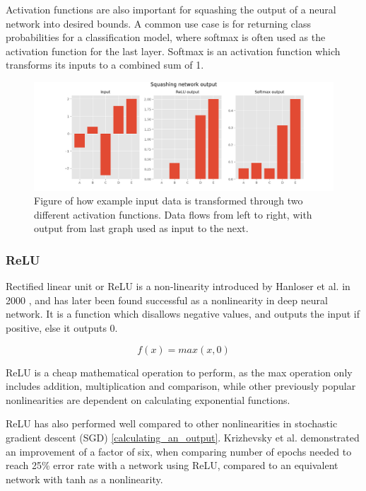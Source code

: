 Activation functions are also important for squashing the output of a neural network into desired bounds. A common use case is for returning class probabilities for a classification model, where softmax is often used as the activation function for the last layer. Softmax is an activation function which transforms its inputs to a combined sum of 1.\cite{sharma_understanding_2018}

\begin{figure}[H]
  \centering
    \includegraphics[width=\textwidth]{Assets/Chapter2_Theory/squashin_output_data_using_activation_functions.png}
    \caption{Figure of how example input data is transformed through two different activation functions. Data flows from left to right, with output from last graph used as input to the next.}
\end{figure}




\subsubsection{ReLU}

Rectified linear unit or ReLU is a non-linearity introduced by Hanloser et al. in 2000 \cite{smith_scientist_1997}, and has later been found successful as a nonlinearity in deep neural network. It is a function which disallows negative values, and outputs the input if positive, else it outputs 0.

\begin{equation} \label{eqn:relu}
    f(x) = max(x, 0)
\end{equation}

ReLU is a cheap mathematical operation to perform, as the max operation only includes addition, multiplication and comparison, while other previously popular nonlinearities are dependent on calculating exponential functions. 

ReLU has also performed well compared to other nonlinearities in stochastic gradient descent (SGD) \ref{calculating_an_output}. Krizhevsky et al. demonstrated an improvement of a factor of six, when comparing number of epochs needed to reach 25\% error rate with a network using ReLU, compared to an equivalent network with tanh as a nonlinearity. \cite{krizhevsky_imagenet_2012}

